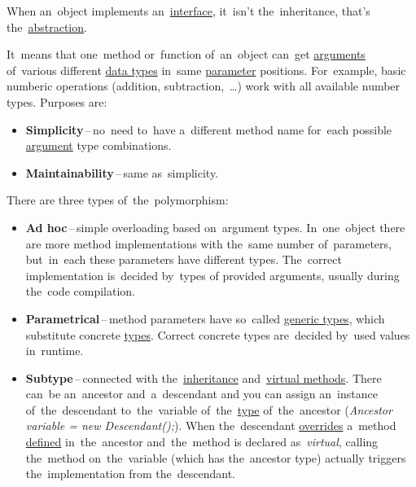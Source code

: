 \warning When an~object implements an~\hyperref[javainterface]{interface}, it~isn't the~inheritance, that's the~\hyperref[abstraction]{abstraction}.

\label{polymorphism}
It~means that one~method or~function of~an~object can~get \hyperref[parameterargument]{arguments} of~various different \hyperref[datatypes]{data types} in~same \hyperref[parameterargument]{parameter} positions. For~example, basic numberic operations (addition, subtraction,~\dots) work with all available number types. Purposes are:
\begin{itemize}
    \item \textbf{Simplicity}\,--\,no~need to~have a~different method name for~each possible \hyperref[parameterargument]{argument} type combinations.
    \item \textbf{Maintainability}\,--\,same as~simplicity.
\end{itemize}

\noindent There are three types of~the~polymorphism:
\begin{itemize}
    \item \textbf{Ad hoc}\,--\,simple overloading based on~argument types. In~one~object there are more method implementations with the~same number of~parameters, but~in~each these parameters have different types. The~correct implementation is~decided by~types of provided arguments, usually during the~code compilation.
    \item \textbf{Parametrical}\,--\,method parameters have so~called \hyperref[javagenerics]{generic types}, which substitute concrete \hyperref[datatypes]{types}. Correct concrete types are~decided by~used values in~runtime.
\end{itemize}
\newpage

\begin{itemize}
    \item \textbf{Subtype}\,--\,connected with the~\hyperref[inheritance]{inheritance} and~\hyperref[javavirtualmethods]{virtual methods}. There can~be an~ancestor and~a~descendant and you can assign an~instance of~the~descendant to~the~variable of~the~\hyperref[datatype]{type} of~the~ancestor (\textit{Ancestor variable = new Descendant();}). When the~descendant \hyperref[javaoverride]{overrides} a~method \hyperref[declarationdefinition]{defined} in~the~ancestor and~the~method is declared as~\textit{virtual}, calling the~method on~the~variable (which has the~ancestor type) actually triggers the~implementation from the~descendant.
\end{itemize}


